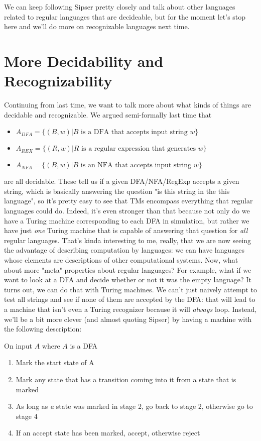 \documentclass[11pt]{article}
\begin{document}
We can keep following Sipser pretty closely and talk about other languages related to regular languages that are decideable, but for the moment let's stop here and we'll do more on recognizable languages next time.

\section{More Decidability and Recognizability}
\label{sec-13}
Continuing from last time, we want to talk more about what kinds of things are decidable and recognizable. We argued semi-formally last time that 

\begin{itemize}
\item $A_{DFA} = \{(B,w)| B \text{ is a DFA that accepts input string } w\}$
\item $A_{REX} = \{(R,w) | R \text{ is a regular expression that generates } w\}$
\item $A_{NFA} = \{(B,w) | B \text{ is an NFA that accepts input string } w\}$
\end{itemize}

are all decidable. These tell us if a given DFA/NFA/RegExp accepts a given string, which is basically answering the question "is this string in the this language", so it's pretty easy to see that TMs encompass everything that regular languages could do. Indeed, it's even stronger than that because not only do we have a Turing machine corresponding to each DFA in simulation, but rather we have just \emph{one} Turing machine that is capable of answering that question for \emph{all} regular languages. That's kinda interesting to me, really, that we are now seeing the advantage of describing computation by languages: we can have languages whose elements are descriptions of other computational systems. Now, what about more "meta" properties about regular languages? For example, what if we want to look at a DFA and decide whether or not it was the empty language? It turns out, we can do that with Turing machines. We can't just naively attempt to test all strings and see if none of them are accepted by the DFA: that will lead to a machine that isn't even a Turing recognizer because it will \emph{always} loop. Instead, we'll be a bit more clever (and almost quoting Sipser) by having a machine with the following description:

On input $A$ where $A$ is a DFA

\begin{enumerate}
\item Mark the start state of A
\item Mark any state that has a transition coming into it from a state that is marked
\item As long as \emph{a} state was marked in stage 2, go back to stage 2, otherwise go to stage 4
\item If an accept state has been marked, accept, otherwise reject
\end{enumerate}
\end{document}
